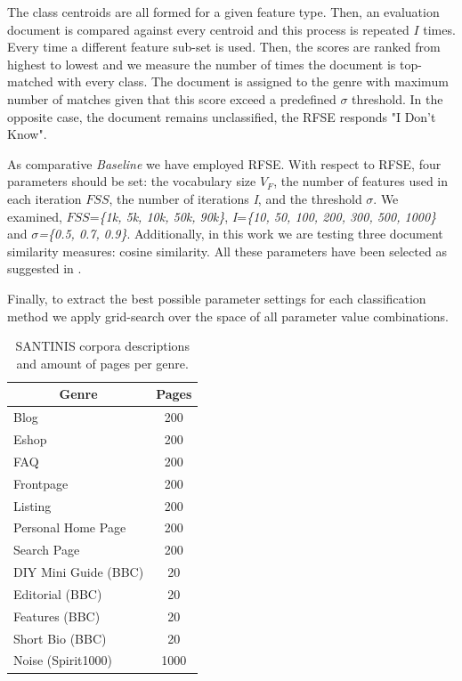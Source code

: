 The class centroids are all formed for a given feature type. Then, an evaluation document is compared against every centroid and this process is repeated $I$ times. Every time a different feature sub-set is used. Then, the scores are ranked from highest to lowest and we measure the number of times the document is top-matched with every class. The document is assigned to the genre with maximum number of matches given that this score exceed a predefined $\sigma$ threshold. In the opposite case, the document remains unclassified, the RFSE responds "I Don't Know".

As comparative \textit{Baseline} we have employed RFSE. With respect to RFSE, four parameters should be set: the vocabulary size $V_{F}$, the number of features used in each iteration $FSS$, the number of iterations \textit{I}, and the threshold $\sigma$. We examined, $FSS$=\textit{\{1k, 5k, 10k, 50k, 90k\}}, \textit{I}=\textit{\{10, 50, 100, 200, 300, 500, 1000\}} and $\sigma$\textit{=\{0.5, 0.7, 0.9\}}. Additionally, in this work we are testing three document similarity measures: cosine similarity. All these parameters have been selected as suggested in \parencite{pritsos2018open}.

Finally, to extract the best possible parameter settings for each classification method we apply grid-search over the space of all parameter value combinations.

\begin{table}
\center
\begin{tabular}{|l|l|}
\hline
\multicolumn{1}{|c|}{Genre} & \multicolumn{1}{c|}{Pages} \\
\hline
\multicolumn{1}{|l|}{Blog} & \multicolumn{1}{c|}{200}  \\
\multicolumn{1}{|l|}{Eshop} & \multicolumn{1}{c|}{200} \\
\multicolumn{1}{|l|}{FAQ} & \multicolumn{1}{c|}{200} \\
\multicolumn{1}{|l|}{Frontpage} & \multicolumn{1}{c|}{200} \\
\multicolumn{1}{|l|}{Listing} & \multicolumn{1}{c|}{200} \\
\multicolumn{1}{|l|}{Personal Home Page} & \multicolumn{1}{c|}{200} \\
\multicolumn{1}{|l|}{Search Page} & \multicolumn{1}{c|}{200} \\
\multicolumn{1}{|l|}{DIY Mini Guide (BBC)} & \multicolumn{1}{c|}{20} \\
\multicolumn{1}{|l|}{Editorial (BBC)} & \multicolumn{1}{c|}{20} \\
\multicolumn{1}{|l|}{Features (BBC)} & \multicolumn{1}{c|}{20} \\
\multicolumn{1}{|l|}{Short Bio (BBC)} & \multicolumn{1}{c|}{20} \\
\multicolumn{1}{|l|}{Noise (Spirit1000)} & \multicolumn{1}{c|}{1000}  \\
\hline
\end{tabular}
\caption {SANTINIS corpora descriptions and amount of pages per genre.}
\label{tbl:genre_tags}
\end{table}


